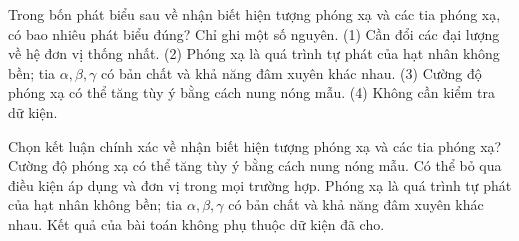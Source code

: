 \begin{ex}
Trong bốn phát biểu sau về nhận biết hiện tượng phóng xạ và các tia phóng xạ, có bao nhiêu phát biểu đúng? Chỉ ghi một số nguyên. (1) Cần đổi các đại lượng về hệ đơn vị thống nhất. (2) Phóng xạ là quá trình tự phát của hạt nhân không bền; tia $\alpha,\beta,\gamma$ có bản chất và khả năng đâm xuyên khác nhau. (3) Cường độ phóng xạ có thể tăng tùy ý bằng cách nung nóng mẫu. (4) Không cần kiểm tra dữ kiện.
\end{ex}

\begin{ex}
Chọn kết luận chính xác về nhận biết hiện tượng phóng xạ và các tia phóng xạ?
\choice
{Cường độ phóng xạ có thể tăng tùy ý bằng cách nung nóng mẫu.}
{Có thể bỏ qua điều kiện áp dụng và đơn vị trong mọi trường hợp.}
{\True Phóng xạ là quá trình tự phát của hạt nhân không bền; tia $\alpha,\beta,\gamma$ có bản chất và khả năng đâm xuyên khác nhau.}
{Kết quả của bài toán không phụ thuộc dữ kiện đã cho.}
\end{ex}

